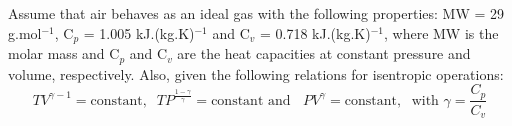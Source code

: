 \documentclass[calculator,steamtables,refrigeranttables,psychrometricchart,datasheet,solutions]{exam}
\newcommand{\frc}{\displaystyle\frac}
\begin{document}
\begin{question}
\begin{enumerate}[(a)]
\begin{enumerate}[(i)]
{}
%
\end{enumerate}

\end{enumerate}
Assume that air behaves as an ideal gas with the following properties: MW = 29 g.mol$^{-1}$, C$_{p}$ = 1.005 kJ.(kg.K)$^{-1}$ and C$_{v}$ = 0.718 kJ.(kg.K)$^{-1}$, where MW is the molar mass and C$_{p}$ and C$_{v}$ are the heat capacities at constant pressure and volume, respectively. Also, given the following relations for isentropic operations:%
\begin{displaymath}
TV^{\gamma-1}=\text{constant},\;\; TP^{\frac{1-\gamma}{\gamma}}=\text{constant and }\;\; PV^{\gamma}=\text{constant},\;\text{ with } \gamma = \frc{C_{p}}{C_{v}}
\end{displaymath}

\end{question}

\clearpage
\end{document}
